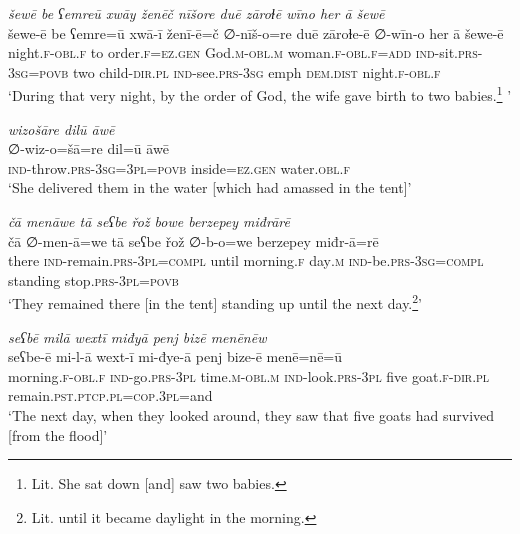 \ea \label{ZB.24}
\textit{šewē be ʕemreū xwāy ženēč nīšore duē zāroɫē wīno her ā šewē} \\ 
\gll šewe-ē be ʕemre=ū xwā-ī ženī-ē=č ∅-nīš-o=re duē zāroɫe-ē ∅-wīn-o her ā šewe-ē \\ 
 night\textsc{.f}\textsc{-obl}\textsc{.f} to order\textsc{.f}\textsc{\textsc{=ez.gen}} God\textsc{.m}\textsc{-obl}\textsc{.m} woman\textsc{.f}\textsc{-obl}\textsc{.f}\textsc{=add} \textsc{ind-}sit\textsc{.prs}\textsc{-3sg}\textsc{=\textsc{povb}} two child\textsc{-dir}\textsc{.pl} \textsc{ind-}see\textsc{.prs}\textsc{-3sg} emph \textsc{dem.dist} night\textsc{.f}\textsc{-obl}\textsc{.f} \\ 
\glt `During that very night, by the order of God, the wife gave birth to two babies.\footnote{Lit. She sat down [and] saw two babies.} '
\z 
 
\ea \label{ZB.25}
\textit{wizošāre dilū āwē} \\ 
\gll ∅-wiz-o=šā=re dil=ū āwē \\ 
 \textsc{ind-}throw\textsc{.prs}\textsc{-3sg=3pl}\textsc{=\textsc{povb}} inside\textsc{\textsc{=ez.gen}} water\textsc{.obl}\textsc{.f} \\ 
\glt `She delivered them in the water [which had amassed in the tent]'
\z 
 
\ea \label{ZB.26}
\textit{čā menāwe tā seʕbe řož bowe berzepey miđrārē} \\ 
\gll čā ∅-men-ā=we tā seʕbe řož ∅-b-o=we berzepey miđr-ā=rē \\ 
 there \textsc{ind-}remain\textsc{.prs}\textsc{-3pl}\textsc{=compl} until morning\textsc{.f} day\textsc{.m} \textsc{ind-}be\textsc{.prs}\textsc{-3sg}\textsc{=\textsc{compl}} standing stop\textsc{.prs}\textsc{-3pl}\textsc{=\textsc{povb}} \\ 
\glt `They remained there [in the tent] standing up until the next day.\footnote{Lit. until it became daylight in the morning.}'
\z 
 
\ea \label{ZB.27}
\textit{seʕbē milā wextī miđyā penj bizē menēnēw} \\ 
\gll seʕbe-ē mi-l-ā wext-ī mi-đye-ā penj bize-ē menē=nē=ū \\ 
 morning\textsc{.f}\textsc{-obl}\textsc{.f} \textsc{ind-}go\textsc{.prs}\textsc{-3pl} time\textsc{.m}\textsc{-obl}\textsc{.m} \textsc{ind-}look\textsc{.prs}\textsc{-3pl} five goat\textsc{.f}\textsc{-dir}\textsc{.pl} remain\textsc{.pst}\textsc{.ptcp}\textsc{.pl}\textsc{=cop}\textsc{.3pl}=and \\ 
\glt `The next day, when they looked around, they saw that five goats had survived [from the flood]'
\z 
 
